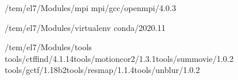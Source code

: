 \documentclass[a4paper,10pt,english]{sphinxmanual}
\begin{document}
\begin{sphinxVerbatim}[commandchars=\\\{\}]
\PYGZhy{}\PYGZhy{}\PYGZhy{}\PYGZhy{}\PYGZhy{}\PYGZhy{}\PYGZhy{}\PYGZhy{}\PYGZhy{}\PYGZhy{}\PYGZhy{}\PYGZhy{}\PYGZhy{}\PYGZhy{}\PYGZhy{}\PYGZhy{}\PYGZhy{}\PYGZhy{}\PYGZhy{}\PYGZhy{}\PYGZhy{}\PYGZhy{}\PYGZhy{}\PYGZhy{}\PYGZhy{}\PYGZhy{}\PYGZhy{}\PYGZhy{}\PYGZhy{}\PYGZhy{}\PYGZhy{}\PYGZhy{}\PYGZhy{}\PYGZhy{}\PYGZhy{}\PYGZhy{}\PYGZhy{}\PYGZhy{}\PYGZhy{}\PYGZhy{}\PYGZhy{}\PYGZhy{}\PYGZhy{}\PYGZhy{}\PYGZhy{}\PYGZhy{}\PYGZhy{}\PYGZhy{}/tem/el7/Modules/mpi\PYGZhy{}\PYGZhy{}\PYGZhy{}\PYGZhy{}\PYGZhy{}\PYGZhy{}\PYGZhy{}\PYGZhy{}\PYGZhy{}\PYGZhy{}\PYGZhy{}\PYGZhy{}\PYGZhy{}\PYGZhy{}\PYGZhy{}\PYGZhy{}\PYGZhy{}\PYGZhy{}\PYGZhy{}\PYGZhy{}\PYGZhy{}\PYGZhy{}\PYGZhy{}\PYGZhy{}\PYGZhy{}\PYGZhy{}\PYGZhy{}\PYGZhy{}\PYGZhy{}\PYGZhy{}\PYGZhy{}\PYGZhy{}\PYGZhy{}\PYGZhy{}\PYGZhy{}\PYGZhy{}\PYGZhy{}\PYGZhy{}\PYGZhy{}\PYGZhy{}\PYGZhy{}\PYGZhy{}\PYGZhy{}\PYGZhy{}\PYGZhy{}\PYGZhy{}\PYGZhy{}\PYGZhy{}\PYGZhy{}
mpi/gcc/openmpi/4.0.3

\PYGZhy{}\PYGZhy{}\PYGZhy{}\PYGZhy{}\PYGZhy{}\PYGZhy{}\PYGZhy{}\PYGZhy{}\PYGZhy{}\PYGZhy{}\PYGZhy{}\PYGZhy{}\PYGZhy{}\PYGZhy{}\PYGZhy{}\PYGZhy{}\PYGZhy{}\PYGZhy{}\PYGZhy{}\PYGZhy{}\PYGZhy{}\PYGZhy{}\PYGZhy{}\PYGZhy{}\PYGZhy{}\PYGZhy{}\PYGZhy{}\PYGZhy{}\PYGZhy{}\PYGZhy{}\PYGZhy{}\PYGZhy{}\PYGZhy{}\PYGZhy{}\PYGZhy{}\PYGZhy{}\PYGZhy{}\PYGZhy{}\PYGZhy{}\PYGZhy{}\PYGZhy{}\PYGZhy{}\PYGZhy{}\PYGZhy{}\PYGZhy{}/tem/el7/Modules/virtualenv\PYGZhy{}\PYGZhy{}\PYGZhy{}\PYGZhy{}\PYGZhy{}\PYGZhy{}\PYGZhy{}\PYGZhy{}\PYGZhy{}\PYGZhy{}\PYGZhy{}\PYGZhy{}\PYGZhy{}\PYGZhy{}\PYGZhy{}\PYGZhy{}\PYGZhy{}\PYGZhy{}\PYGZhy{}\PYGZhy{}\PYGZhy{}\PYGZhy{}\PYGZhy{}\PYGZhy{}\PYGZhy{}\PYGZhy{}\PYGZhy{}\PYGZhy{}\PYGZhy{}\PYGZhy{}\PYGZhy{}\PYGZhy{}\PYGZhy{}\PYGZhy{}\PYGZhy{}\PYGZhy{}\PYGZhy{}\PYGZhy{}\PYGZhy{}\PYGZhy{}\PYGZhy{}\PYGZhy{}\PYGZhy{}\PYGZhy{}\PYGZhy{}
conda/2020.11

\PYGZhy{}\PYGZhy{}\PYGZhy{}\PYGZhy{}\PYGZhy{}\PYGZhy{}\PYGZhy{}\PYGZhy{}\PYGZhy{}\PYGZhy{}\PYGZhy{}\PYGZhy{}\PYGZhy{}\PYGZhy{}\PYGZhy{}\PYGZhy{}\PYGZhy{}\PYGZhy{}\PYGZhy{}\PYGZhy{}\PYGZhy{}\PYGZhy{}\PYGZhy{}\PYGZhy{}\PYGZhy{}\PYGZhy{}\PYGZhy{}\PYGZhy{}\PYGZhy{}\PYGZhy{}\PYGZhy{}\PYGZhy{}\PYGZhy{}\PYGZhy{}\PYGZhy{}\PYGZhy{}\PYGZhy{}\PYGZhy{}\PYGZhy{}\PYGZhy{}\PYGZhy{}\PYGZhy{}\PYGZhy{}\PYGZhy{}\PYGZhy{}\PYGZhy{}\PYGZhy{}/tem/el7/Modules/tools\PYGZhy{}\PYGZhy{}\PYGZhy{}\PYGZhy{}\PYGZhy{}\PYGZhy{}\PYGZhy{}\PYGZhy{}\PYGZhy{}\PYGZhy{}\PYGZhy{}\PYGZhy{}\PYGZhy{}\PYGZhy{}\PYGZhy{}\PYGZhy{}\PYGZhy{}\PYGZhy{}\PYGZhy{}\PYGZhy{}\PYGZhy{}\PYGZhy{}\PYGZhy{}\PYGZhy{}\PYGZhy{}\PYGZhy{}\PYGZhy{}\PYGZhy{}\PYGZhy{}\PYGZhy{}\PYGZhy{}\PYGZhy{}\PYGZhy{}\PYGZhy{}\PYGZhy{}\PYGZhy{}\PYGZhy{}\PYGZhy{}\PYGZhy{}\PYGZhy{}\PYGZhy{}\PYGZhy{}\PYGZhy{}\PYGZhy{}\PYGZhy{}\PYGZhy{}\PYGZhy{}\PYGZhy{}
tools/ctffind/4.1.14tools/motioncor2/1.3.1tools/summovie/1.0.2
tools/gctf/1.18\PYGZus{}b2tools/resmap/1.1.4tools/unblur/1.0.2



\end{sphinxVerbatim}
\end{document}
